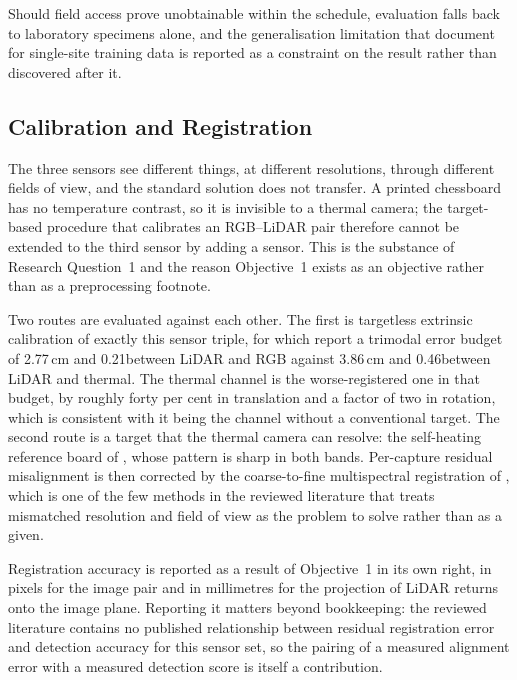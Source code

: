 Should field access prove unobtainable within the schedule, evaluation falls
back to laboratory specimens alone, and the generalisation limitation that
\citet{Nash2022} document for single-site training data is reported as a
constraint on the result rather than discovered after it.

\subsection{Calibration and Registration}

The three sensors see different things, at different resolutions, through
different fields of view, and the standard solution does not transfer. A printed
chessboard has no temperature contrast, so it is invisible to a thermal camera;
the target-based procedure that calibrates an RGB--LiDAR pair therefore cannot
be extended to the third sensor by adding a sensor. This is the substance of
Research Question~1 and the reason Objective~1 exists as an objective rather than
as a preprocessing footnote.

Two routes are evaluated against each other. The first is targetless extrinsic
calibration of exactly this sensor triple, for which \citet{Yang2024} report a
trimodal error budget of 2.77\,cm and 0.21\textdegree between LiDAR
and RGB against 3.86\,cm and 0.46\textdegree between LiDAR and
thermal. The thermal channel is the worse-registered one in that budget, by
roughly forty per cent in translation and a factor of two in rotation, which is
consistent with it being the channel without a conventional target. The second
route is a target that the thermal camera can resolve: the self-heating
reference board of \citet{Nooralishahi2022}, whose pattern is sharp in both
bands. Per-capture residual misalignment is then corrected by the coarse-to-fine
multispectral registration of \citet{Li2024c}, which is one of the few methods
in the reviewed literature that treats mismatched resolution and field of view
as the problem to solve rather than as a given.

Registration accuracy is reported as a result of Objective~1 in its own right,
in pixels for the image pair and in millimetres for the projection of LiDAR
returns onto the image plane. Reporting it matters beyond bookkeeping: the
reviewed literature contains no published relationship between residual
registration error and detection accuracy for this sensor set, so the pairing of
a measured alignment error with a measured detection score is itself a
contribution.

